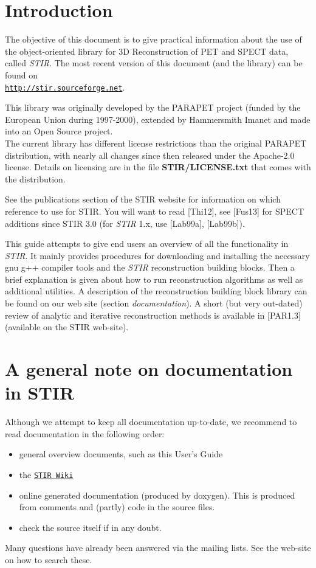 \documentclass{article}
\def\url#1#2{\mbox{\href{#1}{\tt #2}}}
\begin{document}
\section{
Introduction}

The objective of this document is to give practical information 
about the use of the object-oriented library for 3D Reconstruction 
of PET and SPECT data, called \textit{STIR}. The most recent version of this 
document (and the library) can be found on \\
\url{http://stir.sourceforge.net}{http://stir.sourceforge.net}.


This library was originally developed by the PARAPET 
project (funded by the European Union during 1997-2000), extended by Hammersmith 
Imanet and made into an Open Source project. \\
The current library has different license restrictions than the 
original PARAPET distribution, with nearly all changes since then released under the Apache-2.0 license.
Details on licensing are in the file \textbf{STIR/LICENSE.txt} 
that comes with the distribution. 

See the publications section of the STIR website for information on which reference
to use for STIR. You will want to read {[}Thi12], see {[}Fus13] for SPECT additions
since STIR 3.0 (for \textit{STIR} 1.x, use [Lab99a], [Lab99b]).



This guide attempts to give end users an overview of all the functionality
in \textit{STIR}. It mainly provides 
procedures for downloading and installing the necessary gnu g++ 
compiler tools and the \textit{STIR} reconstruction building blocks. 
Then a brief explanation is given about how to run reconstruction 
algorithms as well as additional utilities. A description of 
the reconstruction building block library can be found on our 
web site (section \textit{documentation}). A short (but very out-dated) review of analytic 
and iterative reconstruction methods is available in [PAR1.3] 
(available on the STIR web-site).

\section{
A general note on documentation in STIR}

Although we attempt to keep all documentation up-to-date, we 
recommend to read documentation in the following order:
\begin{itemize}
\item general overview documents, such as this User's Guide
\item the \url{http://stir.sourceforge.net/wiki}{STIR Wiki}
\item 
online generated documentation (produced by doxygen). This is 
produced from comments and (partly) code in the source files.
\item check the source itself if in any doubt.
\end{itemize}
Many questions have already been answered via the mailing lists. See the
web-site on how to search these.
\end{document}
